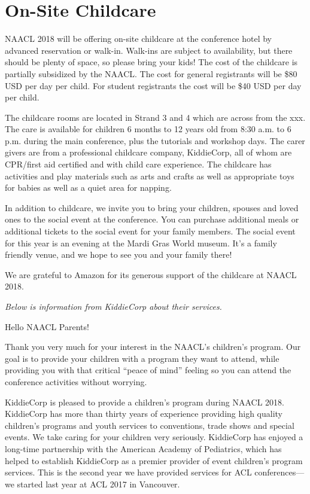 \chapter{On-Site Childcare}

NAACL 2018 will be offering on-site childcare at the conference hotel by advanced reservation or walk-in.   Walk-ins are subject to availability, but there should be plenty of space, so please bring your kids!  The cost of the childcare is partially subsidized by the NAACL. The cost for general registrants will be \$80 USD per day per child. For student registrants the cost will be \$40 USD per day per child.

The childcare rooms are located in Strand 3 and 4 which are across from the xxx. 
The care is available for children 6 months to 12 years old from 8:30 a.m. to 6 p.m. during the main conference, plus the tutorials and workshop days. The carer givers are from a professional childcare company, KiddieCorp, all of whom are CPR/first aid certified and with child care experience. The childcare has activities and play materials such as arts and crafts as well as appropriate toys for babies as well as a quiet area for napping.  

In addition to childcare, we invite you to bring your children, spouses and loved ones to the social event at the conference. You can purchase additional meals or additional tickets to the social event for your family members. The social event for this year is an evening at the Mardi Gras World museum. It's a family friendly venue, and we hope to see you and your family there!


We are grateful to Amazon for its generous support of the childcare at NAACL 2018.


\emph{Below is information from KiddieCorp about their services.}


Hello NAACL Parents!

Thank you very much for your interest in the NAACL's children's program.
Our goal is to provide your children with a program they want to attend,
while providing you with that critical ``peace of mind'' feeling so you can
attend the conference activities without worrying.

KiddieCorp is pleased to provide a children's program during NAACL 2018.
KiddieCorp has more than thirty years of experience providing high quality
children's programs and youth services to conventions, trade shows and
special events. We take caring for your children very seriously. KiddieCorp
has enjoyed a long-time partnership with the American Academy of Pediatrics,
which has helped to establish KiddieCorp as a premier provider of event
children's program services.  This is the second year we have provided
services for ACL conferences---we started last year at ACL 2017 in
Vancouver. 


